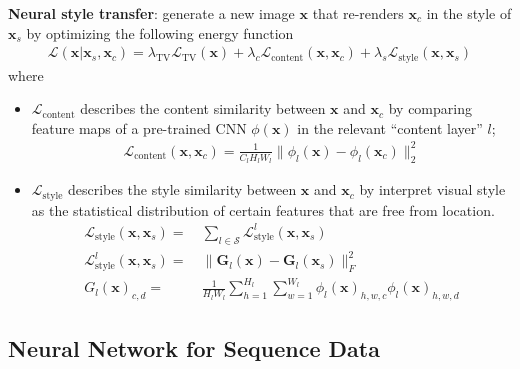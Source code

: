 \textbf{Neural style transfer}: 
generate a new image $\bm{x}$ that re-renders $\bm{x}_c$ in the style of $\bm{x}_s$ 
by optimizing the following energy function
\begin{gather}
    \mathcal{L}(\bm{x}|\bm{x}_s,\bm{x}_c) 
    = \lambda_{\mathrm{TV}}\mathcal{L}_{\mathrm{TV}}(\bm{x}) 
    + \lambda_c\mathcal{L}_{\text{content}}(\bm{x},\bm{x}_c)
    + \lambda_s\mathcal{L}_{\text{style}}(\bm{x},\bm{x}_s) 
\end{gather}
where 
\begin{itemize}
    \item $\mathcal{L}_{\text{content}}$ describes the content similarity between $\bm{x}$ and $\bm{x}_c$ 
    by comparing feature maps of a pre-trained CNN $\phi(\bm{x})$ in the relevant ``content layer'' $l$;
    \begin{gather}
        \mathcal{L}_{\text{content}}(\bm{x},\bm{x}_c)=\frac{1}{C_lH_lW_l}\|\phi_l(\bm{x})-\phi_l(\bm{x}_c)\|_2^2
    \end{gather}
    \item $\mathcal{L}_{\text{style}}$ describes the style similarity between $\bm{x}$ and $\bm{x}_c$
    by interpret visual style as the statistical distribution of certain features that are free from location.
    \begin{align}
        \mathcal{L}_{\text{style}}(\bm{x},\bm{x}_s) =&~
        \sum_{l\in\mathcal{S}}\mathcal{L}_\text{style}^l(\bm{x},\bm{x}_s) \\
        \mathcal{L}_\text{style}^l(\bm{x},\bm{x}_s) =&~
        \|\mathbf{G}_l(\bm{x})-\mathbf{G}_l(\bm{x}_s)\|_F^2 \\
        G_l(\bm{x})_{c,d} =&~ 
        \frac{1}{H_lW_l}\sum_{h=1}^{H_l}\sum_{w=1}^{W_l}\phi_l(\bm{x})_{h,w,c}\phi_l(\bm{x})_{h,w,d}
    \end{align}
\end{itemize}


\subsection{Neural Network for Sequence Data}

